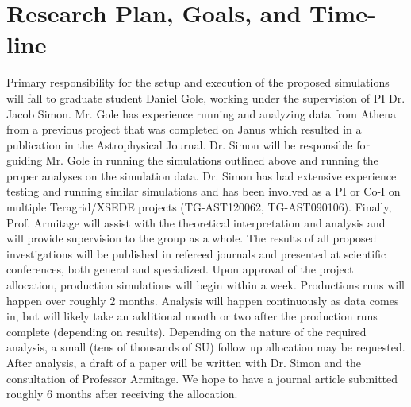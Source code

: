 \documentclass[preprint]{aastex}
\begin{document}
\section{Research Plan, Goals, and Time-line}
\vspace{-2mm}
Primary responsibility for the setup and execution of the proposed simulations will fall to graduate student Daniel Gole, working under the supervision of PI Dr. Jacob Simon.  Mr. Gole has experience running and analyzing data from  {\sc Athena} from a previous project that was completed on {\sc Janus} which resulted in a publication in the Astrophysical Journal.  Dr. Simon will be responsible for guiding Mr. Gole in running the simulations outlined above and running the proper analyses on the simulation data. Dr. Simon has had extensive experience testing and running similar simulations and has been involved as a PI or Co-I on multiple Teragrid/XSEDE projects (TG-AST120062, TG-AST090106).  Finally, Prof. Armitage will assist with the theoretical interpretation and analysis and will provide supervision to the group as a whole.  The results of all proposed investigations will be published in refereed journals and presented at scientific conferences, both general and specialized.  Upon approval of the project allocation, production simulations will begin within a week.  Productions runs will happen over roughly 2 months.  Analysis will happen continuously as data comes in, but will likely take an additional month or two after the production runs complete (depending on results).  Depending on the nature of the required analysis, a small (tens of thousands of SU) follow up allocation may be requested.  After analysis, a draft of a paper will be written with Dr. Simon and the consultation of Professor Armitage.  We hope to have a journal article submitted roughly 6 months after receiving the allocation.     



\end{document}
